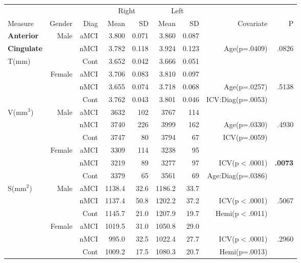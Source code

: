 \documentclass[12pt]{article}
\newcommand\T{\rule{0pt}{2.6ex}}
\newcommand\B{\rule[-1.2ex]{0pt}{0pt}}
\begin{document}
\newpage
\begin{table}[p]
	\centering
	\footnotesize
	\begin{tabular}{l|rr|rrrr|rr}
	\hline
	& & & \multicolumn{2}{c}{Right} \T & \multicolumn{2}{c|}{Left} & & \\
	\multicolumn{1}{l|}{Measure} \T\B & Gender & Diag & Mean & SD & Mean & SD & Covariate & P \\
	\hline\hline
	\textbf{Anterior} & \multirow{3}{*}{Male} & aMCI\T & 3.800 & 0.071 & 3.860 & 0.087 & & \\
	\textbf{Cingulate}						&						& nMCI & 3.782 & 0.118 & 3.924 & 0.123 & Age(p=.0409) & .0826 \\
	\multirow{2}{*}{T(mm)}						&						& Cont & 3.652 & 0.042 & 3.666 & 0.051 & & \\ \cline{2-9}						
							&	\multirow{3}{*}{Female}	& aMCI\T & 3.706 & 0.083 & 3.810 & 0.097 & & \\
							&						& nMCI & 3.655 & 0.074 & 3.718 & 0.068 & Age(p=.0257) & .5138 \\
							&						& Cont & 3.762 & 0.043 & 3.801 & 0.046 & ICV:Diag(p=.0053) & \\
	\hline
	\multirow{6}{*}{V(mm$^3$)} & \multirow{3}{*}{Male} & aMCI\T & 3632 & 102 & 3767 & 114 & &   \\
							&						& nMCI & 3740 & 226 & 3999 & 162 & Age(p=.0330) & .4930 \\
							&						& Cont & 3747 & 80 & 3794 & 67 & ICV(p=.0059) & \\\cline{2-9}
							&	\multirow{3}{*}{Female}	& aMCI\T & 3309 & 114 & 3238 & 95 & & \\
							&						& nMCI & 3219 & 89 & 3277 & 97 & ICV(p$<$.0001) & \textbf{.0073}\\
							&						& Cont & 3379 & 65 & 3561 & 69 & Age:Diag(p=.0386) & \\
	\hline
	\multirow{6}{*}{S(mm$^2$)} & \multirow{3}{*}{Male} & aMCI\T & 1138.4 & 32.6 & 1186.2 & 33.7 & & \\
							&						& nMCI & 1137.4 & 50.8 & 1202.2 & 37.2 &  ICV(p$<$.0001) & .5067 \\
							&						& Cont & 1145.7 & 21.0 & 1207.9 & 19.7 & Hemi(p$<$.0011) & \\\cline{2-9}
							&	\multirow{3}{*}{Female}	& aMCI\T & 1019.5 & 31.0 & 1050.8 & 29.0 & &\\
							&						& nMCI & 995.0 & 32.5 & 1022.4 & 27.7 & ICV(p$<$.0001) & .2960\\
							&						& Cont & 1009.2 & 17.5 & 1080.3 & 20.7 & Hemi(p=.0013) & \\

\end{tabular}
\end{table}
\end{document}
